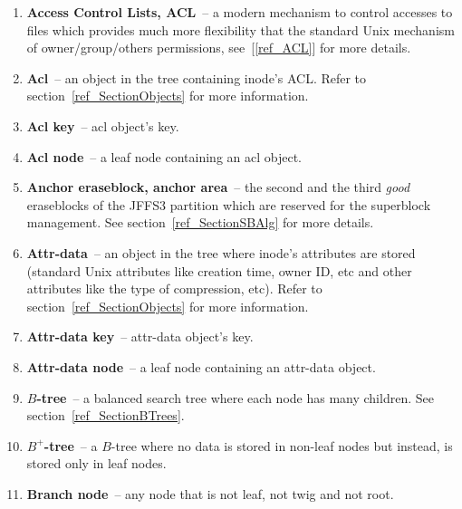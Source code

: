 %
%
%
%

\begin{enumerate}

\item \textbf{Access Control Lists, ACL}~-- a modern mechanism to control
accesses to files which provides much more flexibility that the standard Unix
mechanism of owner/group/others permissions, see~[\ref{ref_ACL}] for more
details.

\item \textbf{Acl}~-- an object in the tree containing inode's ACL. Refer to
section~\ref{ref_SectionObjects} for more information.

\item \textbf{Acl key}~-- acl object's key.

\item \textbf{Acl node}~-- a leaf node containing an acl object.

\item \textbf{Anchor eraseblock, anchor area}~-- the second and the third
\emph{good} eraseblocks of the JFFS3 partition which are reserved for the
superblock management. See section~\ref{ref_SectionSBAlg} for more details.

\item \textbf{Attr-data}~-- an object in the tree where inode's attributes are
stored (standard Unix attributes like creation time, owner ID, etc and other
attributes like the type of compression, etc). Refer to
section~\ref{ref_SectionObjects} for more information.

\item \textbf{Attr-data key}~-- attr-data object's key.

\item \textbf{Attr-data node}~-- a leaf node containing an \mbox{attr-data}
object.

\item \textbf{$B$-tree}~-- a balanced search tree where each node has many
children. See section~\ref{ref_SectionBTrees}.

\item \textbf{$B^+$-tree}~-- a \mbox{$B$-tree} where no data is stored in
\mbox{non-leaf} nodes but instead, is stored only in leaf nodes.

\item \textbf{Branch node}~-- any node that is not leaf, not twig and not root.


\end{enumerate}
